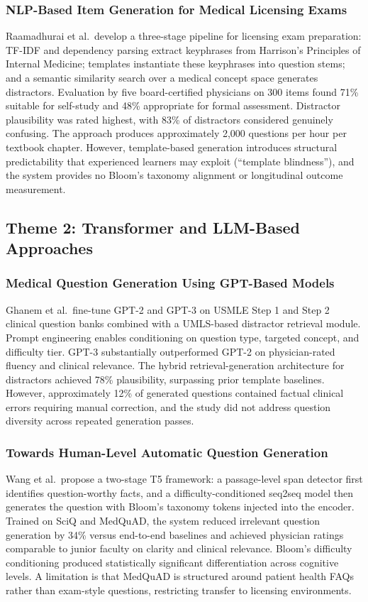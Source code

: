 \documentclass[conference]{IEEEtran}
\begin{document}
\subsubsection{NLP-Based Item Generation for Medical Licensing Exams~\cite{raamadhurai2019nlp}}
Raamadhurai et al.\ develop a three-stage pipeline for licensing exam preparation: TF-IDF and dependency parsing extract keyphrases from Harrison's Principles of Internal Medicine; templates instantiate these keyphrases into question stems; and a semantic similarity search over a medical concept space generates distractors. Evaluation by five board-certified physicians on 300 items found 71\% suitable for self-study and 48\% appropriate for formal assessment. Distractor plausibility was rated highest, with 83\% of distractors considered genuinely confusing. The approach produces approximately 2,000 questions per hour per textbook chapter. However, template-based generation introduces structural predictability that experienced learners may exploit (``template blindness''), and the system provides no Bloom's taxonomy alignment or longitudinal outcome measurement.

\subsection{Theme 2: Transformer and LLM-Based Approaches}

\subsubsection{Medical Question Generation Using GPT-Based Models~\cite{ghanem2022medical}}
Ghanem et al.\ fine-tune GPT-2 and GPT-3 on USMLE Step 1 and Step 2 clinical question banks combined with a UMLS-based distractor retrieval module. Prompt engineering enables conditioning on question type, targeted concept, and difficulty tier. GPT-3 substantially outperformed GPT-2 on physician-rated fluency and clinical relevance. The hybrid retrieval-generation architecture for distractors achieved 78\% plausibility, surpassing prior template baselines. However, approximately 12\% of generated questions contained factual clinical errors requiring manual correction, and the study did not address question diversity across repeated generation passes.

\subsubsection{Towards Human-Level Automatic Question Generation~\cite{wang2022towards}}
Wang et al.\ propose a two-stage T5 framework: a passage-level span detector first identifies question-worthy facts, and a difficulty-conditioned seq2seq model then generates the question with Bloom's taxonomy tokens injected into the encoder. Trained on SciQ and MedQuAD, the system reduced irrelevant question generation by 34\% versus end-to-end baselines and achieved physician ratings comparable to junior faculty on clarity and clinical relevance. Bloom's difficulty conditioning produced statistically significant differentiation across cognitive levels. A limitation is that MedQuAD is structured around patient health FAQs rather than exam-style questions, restricting transfer to licensing environments.
\end{document}
